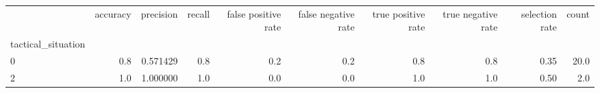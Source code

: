 \begin{tabular}{lrrrrrrrrr}
\toprule
{} &  accuracy &  precision &  recall &  false positive rate &  false negative rate &  true positive rate &  true negative rate &  selection rate &  count \\
tactical\_situation &           &            &         &                      &                      &                     &                     &                 &        \\
\midrule
0                  &       0.8 &   0.571429 &     0.8 &                  0.2 &                  0.2 &                 0.8 &                 0.8 &            0.35 &   20.0 \\
2                  &       1.0 &   1.000000 &     1.0 &                  0.0 &                  0.0 &                 1.0 &                 1.0 &            0.50 &    2.0 \\
\bottomrule
\end{tabular}
